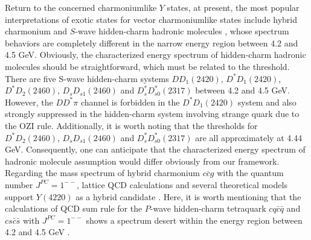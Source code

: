 \documentclass[final,5p,times,twocolumn]{elsarticle}
\begin{document}
Return to the concerned charmoniumlike $Y$ states, at present, the most popular interpretations of exotic states for vector charmoniumlike states include hybrid charmonium and $S$-wave hidden-charm hadronic molecules \cite{Chen:2016qju}, whose spectrum behaviors are completely different in the narrow energy region between 4.2 and 4.5 GeV. Obviously, the characterized energy spectrum of hidden-charm hadronic molecules should be straightforward, which must be related to the threshold. 
There are five S-wave hidden-charm systems $DD_1(2420)$, $D^*D_1(2420)$, $D^*D_2(2460)$, $D_sD_{s1}(2460)$ and $D_s^*D_{s0}^{*}(2317)$ between 4.2 and 4.5 GeV. However, the $DD^*\pi$ channel is forbidden in the $D^*D_1(2420)$ system and also strongly suppressed in the hidden-charm system involving strange quark due to the OZI rule. Additionally, it is worth noting that the thresholds for $D^*D_2(2460)$, $D_sD_{s1}(2460)$ and $D_s^*D_{s0}^{*}(2317)$  are all approximately at 4.44 GeV. Consequently, one can anticipate that the characterized energy spectrum of hadronic molecule assumption would differ obviously from our framework.
Regarding the mass spectrum of hybrid charmonium $c\bar{c}g$ with the quantum number $J^{PC}=1^{--}$, lattice QCD calculations and several theoretical models support $Y(4220)$ as a hybrid candidate \cite{HadronSpectrum:2012gic,Zhu:2005hp,Close:2005iz,Kou:2005gt,Guo:2008yz,Segovia:2014mca}. 
Here, it is worth mentioning that the calculations of QCD sum rule for the $P$-wave hidden-charm tetraquark $cq\bar{c}\bar{q}$ and $cs\bar{c}\bar{s}$ with $J^{PC}=1^{--}$ shows a spectrum desert within the energy region between 4.2 and 4.5 GeV \cite{Chen:2010ze}.
\end{document}
